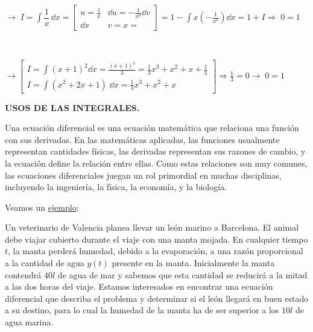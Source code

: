 {\begin{ejre}
$\to \; I=\displaystyle \int \dfrac 1 x \, \dd x = \left[ \begin{matrix} u=\frac 1 x & \dd u = -\frac 1 {x^2} \dd v \\ \dd x & v= x = \end{matrix} \right] =1-\int x \left( - \frac 1 {x^2} \right) \dd x=1 + I \Rightarrow \boxed{\; 0=1\;} $

$\quad$


$\to \left[ \begin{matrix}
 I=\displaystyle \int (x+1)^2 \dd x =\frac {(x+1)^3}{3}=\frac 1 3 x^3 + x^2 + x + \frac 1 3  \\  
 I=\displaystyle \int (x^2+2x+1)\; \dd x= \frac 1 3 x^3 + x^2 + x  \end{matrix} \right] \Rightarrow \frac 1 3 = 0 \to  \boxed{\; 0 = 1 \;} $
\end{ejre}

 
 \begin{proofw}\renewcommand{\qedsymbol}{$\diamond$}
 
 
 

 
 \end{proofw}


\textbf{USOS DE LAS INTEGRALES.}

Una ecuación diferencial es una ecuación matemática que relaciona una función con sus derivadas. En las matemáticas aplicadas, las funciones usualmente representan cantidades físicas, las derivadas representan sus razones de cambio, y la ecuación define la relación entre ellas. Como estas relaciones son muy comunes, las ecuaciones diferenciales juegan un rol primordial en muchas disciplinas, incluyendo la ingeniería, la física, la economía, y la biología.

Veamos un \underline{ejemplo}:


Un veterinario de Valencia planea llevar un león marino a Barcelona. El animal debe viajar cubierto durante el viaje con una manta mojada. En cualquier tiempo $t$, la manta perderá humedad, debido a la evaporación, a una razón proporcional a la cantidad de agua $y(t)$ presente en la manta. Inicialmente la manta contendrá $40l$ de agua de mar y sabemos que esta cantidad se reducirá a la mitad a las dos horas del viaje. Estamos interesados en encontrar una ecuación diferencial que describa el problema y determinar si el león llegará en buen estado a su destino, para lo cual la humedad de la manta ha de ser superior a los $10l$ de agua marina.

}
